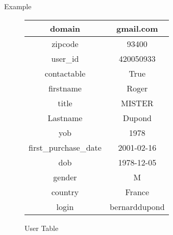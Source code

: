 \documentclass[pdf]{beamer}
\begin{document}
\begin{frame}{Example}
\begin{figure}
\begin{tabular}{|c|c|}
			\hline
domain &  gmail.com\\ \hline
zipcode &  93400 \\ \hline
user\_id &  420050933 \\ \hline
contactable &  True \\ \hline
firstname & Roger \\ \hline
title & MISTER \\ \hline
Lastname & Dupond \\ \hline
yob & 1978 \\ \hline
first\_purchase\_date & 2001-02-16 \\ \hline
dob & 1978-12-05 \\ \hline
gender & M \\ \hline
country & France \\ \hline
login & bernarddupond \\ \hline
\end{tabular}
\caption{User Table}
\end{figure}
\end{frame}
\end{document}
